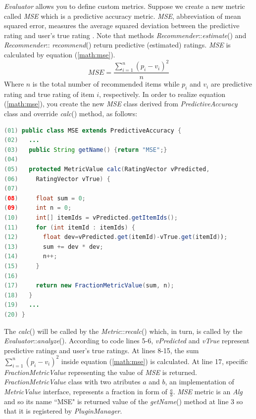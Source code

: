 \documentclass[a4paper]{llncs}
\begin{document}
\textit{Evaluator} allows you to define custom metrics. Suppose we create a new metric called \textit{MSE} which is a predictive accuracy metric. \textit{MSE}, abbreviation of mean squared error, measures the average squared deviation between the predictive rating and user's true rating \cite{herlocker2004}. Note that methods \textit{Recommender}::\textit{estimate}() and \textit{Recommender}:: \textit{recommend}() return predictive (estimated) ratings. \textit{MSE} is calculated by equation (\ref{math:mse}).
\begin{equation} \label{math:mse}
MSE = \frac{\sum_{i=1}^{n}(p_i-v_i)^2}{n}
\end{equation}
Where $n$ is the total number of recommended items while $p_i$ and $v_i$ are predictive rating and true rating of item $i$, respectively. In order to realize equation (\ref{math:mse}), you create the new \textit{MSE} class derived from \textit{PredictiveAccuracy} class and override \textit{calc}() method, as follows:
\begin{small}
\begin{lstlisting}[language = Java]
(01) public class MSE extends PredictiveAccuracy {
(02)   ...
(03)   public String getName() {return "MSE";}
(04)
(05)   protected MetricValue calc(RatingVector vPredicted,
(06)     RatingVector vTrue) {
(07) 
(08)     float sum = 0;
(09)     int n = 0;
(10)     int[] itemIds = vPredicted.getItemIds();
(11)     for (int itemId : itemIds) {
(12)       float dev=vPredicted.get(itemId)-vTrue.get(itemId));
(13)       sum += dev * dev;
(14)       n++;
(15)     }
(16) 
(17)     return new FractionMetricValue(sum, n);
(18)   }
(19)   ...
(20) }
\end{lstlisting}
\end{small}
The \textit{calc}() will be called by the \textit{Metric}::\textit{recalc}() which, in turn, is called by the \textit{Evaluator}::\textit{analyze}(). According to code lines 5-6, \textit{vPredicted} and \textit{vTrue} represent predictive ratings and user's true ratings. At lines 8-15, the sum $\sum_{i=1}^{n}(p_i-v_i)^2$ inside equation (\ref{math:mse}) is calculated. At line 17, specific \textit{FractionMetricValue} representing the value of \textit{MSE} is returned. \textit{FractionMetricValue} class with two atributes $a$ and $b$, an implementation of \textit{MetricValue} interface, represents a fraction in form of $\frac{a}{b}$. \textit{MSE} metric is an \textit{Alg} and so its name ``MSE" is returned value of the \textit{getName}() method at line 3 so that it is registered by \textit{PluginManager}.
\end{document}
